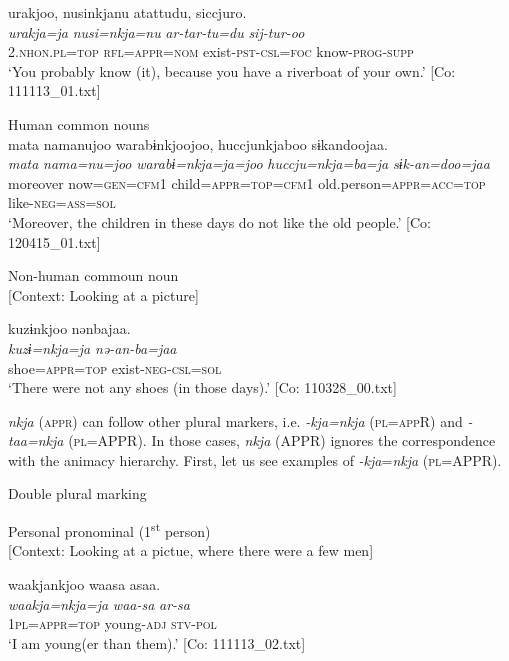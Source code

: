{\TM}
\glll urakjoo,  nusinkjanu  atattudu,    siccjuro.\\
      \textit{urakja=ja}  \textit{nusi=nkja=nu}  \textit{ar-tar-tu=du}    \textit{sij-tur-oo}\\
      2.\textsc{nhon}.\textsc{pl}=\textsc{top}  \textsc{rfl}=\textsc{appr}=\textsc{nom}  exist-\textsc{pst}-\textsc{csl}=\textsc{foc}      know-\textsc{prog}-\textsc{supp}\\
\glt ‘You probably know (it), because you have a riverboat of your own.’ [Co: 111113\_01.txt]
\z

\ex Human common nouns\\
{\TM}
\glll  mata  namanujoo  warabɨnkjoojoo,   huccjunkjaboo  sɨkandoojaa.\\
\textit{mata}  \textit{nama=nu=joo}  \textit{warabɨ=nkja=ja=joo}  \textit{huccju=nkja=ba=ja}  \textit{sɨk-an=doo=jaa}\\
moreover  now=\textsc{gen}=\textsc{cfm}1  child=\textsc{appr}=\textsc{top}=\textsc{cfm1}      old.person=\textsc{appr}=\textsc{acc}=\textsc{top}  like-\textsc{neg}=\textsc{ass}=\textsc{sol}\\
\glt ‘Moreover, the children in these days do not like the old people.’ [Co: 120415\_01.txt]
\z

\ex Non-human commoun noun\\{}
[Context: Looking at a picture]

{\TM}
\glll kuzɨnkjoo  nənbajaa.\\
      \textit{kuzɨ=nkja=ja}  \textit{nə-an-ba=jaa}\\
      shoe=\textsc{appr}=\textsc{top}  exist-\textsc{neg}-\textsc{csl}=\textsc{sol}\\
\glt ‘There were not any shoes (in those days).’ [Co: 110328\_00.txt]
\z

  \textit{nkja} (\textsc{appr}) can follow other plural markers, i.e. \textit{-kja=nkja} (\textsc{pl}=\textsc{app}R) and \textit{-taa=nkja} (\textsc{pl}=APPR). In those cases, \textit{nkja} (APPR) ignores the correspondence with the animacy hierarchy. First, let us see examples of \textit{-kja}=\textit{nkja} (\textsc{pl}=APPR).

\ea\label{ex:6-102}
  Double plural marking

 \ea Personal pronominal (1\textsuperscript{st} person)\\{}
[Context: Looking at a pictue, where there were a few men]

{\TM}
\glll waakjankjoo  waasa  asaa.\footnotemark\\
      \textit{waakja=nkja=ja}  \textit{waa-sa}  \textit{ar-sa}\\
      1\textsc{pl}=\textsc{appr}=\textsc{top}  young-\textsc{adj}  \textsc{stv}-\textsc{pol}\\
\glt ‘I am young(er than them).’ [Co: 111113\_02.txt]
\z

